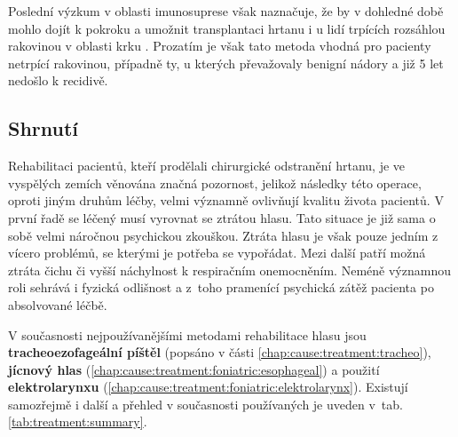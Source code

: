 Poslední výzkum v oblasti imunosuprese však naznačuje, že by v dohledné době
mohlo dojít k pokroku a umožnit transplantaci hrtanu i u lidí trpících
rozsáhlou rakovinou v oblasti krku \cite{Narula2011}. Prozatím je však tato
metoda vhodná pro pacienty netrpící rakovinou, případně ty, u kterých
převažovaly benigní nádory a již 5 let nedošlo k recidivě.


\subsection{Shrnutí} %


Rehabilitaci pacientů, kteří prodělali chirurgické odstranění hrtanu, je ve
vyspělých zemích věnována značná pozornost, jelikož následky této operace,
oproti jiným druhům léčby, velmi významně ovlivňují kvalitu života pacientů. V
první řadě se léčený musí vyrovnat se ztrátou hlasu. Tato situace je již sama
o sobě velmi náročnou psychickou zkouškou. Ztráta hlasu je však pouze jedním z
vícero problémů, se kterými je potřeba se vypořádat. Mezi další patří možná
ztráta čichu či vyšší náchylnost k respiračním onemocněním. Neméně významnou
roli sehrává i fyzická odlišnost a z~toho pramenící psychická zátěž pacienta
po absolvované léčbě.

 V současnosti
nejpoužívanějšími metodami rehabilitace hlasu jsou \textbf{tracheoezofageální
píštěl} (popsáno v části \ref{chap:cause:treatment:tracheo}), \textbf{jícnový
hlas} (\ref{chap:cause:treatment:foniatric:esophageal}) a použití
\textbf{elektrolarynxu} (\ref{chap:cause:treatment:foniatric:elektrolarynx}).
Existují samozřejmě i další a přehled v současnosti používaných je uveden
v~tab. \ref{tab:treatment:summary}.

\newcolumntype{b}{X}

